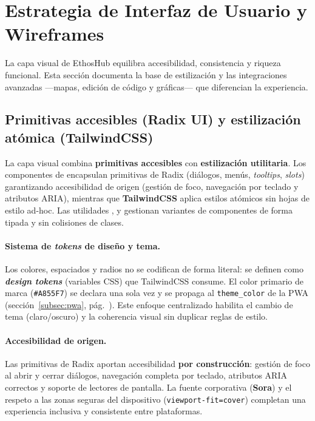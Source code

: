 \section{Estrategia de Interfaz de Usuario y Wireframes}
\label{sec:ui}

La capa visual de EthosHub equilibra accesibilidad, consistencia y riqueza funcional.
Esta sección documenta la base de estilización y las integraciones avanzadas —mapas,
edición de código y gráficas— que diferencian la experiencia.

\subsection{Primitivas accesibles (Radix UI) y estilización atómica (TailwindCSS)}
\label{subsec:radix_tailwind}

La capa visual combina \textbf{primitivas accesibles} con \textbf{estilización
utilitaria}. Los componentes de  encapsulan primitivas de Radix
(diálogos, menús, \textit{tooltips}, \textit{slots}) garantizando accesibilidad de origen
(gestión de foco, navegación por teclado y atributos ARIA), mientras que \textbf{TailwindCSS}
aplica estilos atómicos sin hojas de estilo ad-hoc. Las utilidades
,  y  gestionan
variantes de componentes de forma tipada y sin colisiones de clases.

\paragraph{Sistema de \textit{tokens} de diseño y tema.} Los colores, espaciados y radios
no se codifican de forma literal: se definen como \textbf{\textit{design tokens}}
(variables CSS) que TailwindCSS consume. El color primario de marca (\texttt{\#A855F7})
se declara una sola vez y se propaga al \texttt{theme\_color} de la PWA
(sección~\ref{subsec:pwa}, pág.~\pageref{subsec:pwa}). Este enfoque centralizado habilita
el cambio de tema (claro/oscuro) y la coherencia visual sin duplicar reglas de estilo.

\paragraph{Accesibilidad de origen.} Las primitivas de Radix aportan accesibilidad
\textbf{por construcción}: gestión de foco al abrir y cerrar diálogos, navegación completa
por teclado, atributos ARIA correctos y soporte de lectores de pantalla. La fuente
corporativa (\textbf{Sora}) y el respeto a las zonas seguras del dispositivo
(\texttt{viewport-fit=cover}) completan una experiencia inclusiva y consistente entre
plataformas.

